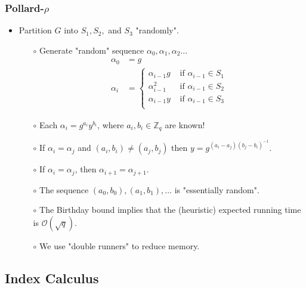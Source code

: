 \documentclass[a4paper]{scrartcl}
\begin{document}
\subsubsection*{Pollard-$\rho$}

\begin{itemize}
\item Partition $G$ into $S_1, S_2,$ and $S_3$ "randomly".
\begin{itemize}
\item [$\circ$] Generate "random" sequence $\alpha_0, \alpha_1, \alpha_2...$
\begin{align*}
\alpha_0 &= g \\
\alpha_i &= 
\left\{
\begin{array}{ll}
\alpha_{i-1}g & \text{\ if \ } \alpha_{i-1} \in S_1\\
\alpha_{i-1}^2 & \text{\ if \ } \alpha_{i-1} \in S_2\\
\alpha_{i-1}y & \text{\ if \ } \alpha_{i-1} \in S_3\\
\end{array}
\right.
\end{align*}
\item [$\circ$] Each $\alpha_i = g^{a_i}y^{b_i}$, where $a_i, b_i \in \mathbb{Z}_q$ are known!
\item [$\circ$] If $\alpha_i = \alpha_j$ and $(a_i,b_i) \neq (a_j,b_j)$ then $y = g^{(a_i-a_j)(b_j-b_i)^{-1}}$.
\item [$\circ$] If $\alpha_i = \alpha_j$, then $\alpha_{i+1} = \alpha_{j+1}$.
\item [$\circ$] The sequence $(a_0,b_0),(a_1,b_1), ...$ is "essentially random".
\item [$\circ$] The Birthday bound implies that the (heuristic) expected running time is $\mathcal{O}(\sqrt{q})$.
\item [$\circ$] We use "double runners" to reduce memory.
\end{itemize}
\end{itemize}

\subsection*{Index Calculus}
\end{document}
